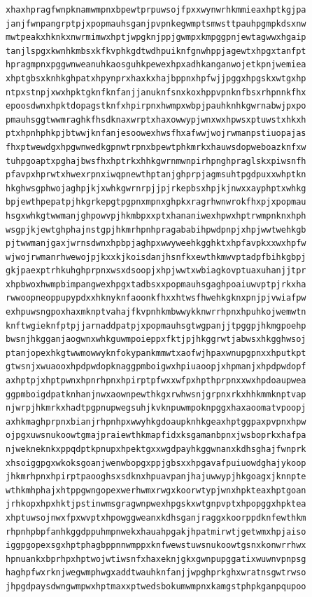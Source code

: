 \documentclass[11pt,letterpaper]{exam}
\begin{document}
\begin{questions}
\begin{verbatim}
xhaxhpragfwnpknamwmpnxbpewtprpuwsojfpxxwynwrhkmmieaxhptkgjpa
janjfwnpangrptpjxpopmauhsganjpvpnkegwmptsmwsttpauhpgmpkdsxnw
mwtpeakxhknkxnwrmimwxhptjwpgknjppjgwmpxkmpggpnjewtagwwxhgaip
tanjlspgxkwnhkmbsxkfkvphkgdtwdhpuiknfgnwhppjagewtxhpgxtanfpt
hpragmpnxpggwnweanuhkaosguhkpewexhpxadhkanganwojetkpnjwemiea
xhptgbsxknhkghpatxhpynprxhaxkxhajbppnxhpfwjjpggxhpgskxwtgxhp
ntpxstnpjxwxhpktgknfknfanjjanuknfsnxkoxhppvpnknfbsxrhpnnkfhx
epoosdwnxhpktdopagstknfxhpirpnxhwmpxwbpjpauhknhkgwrnabwjpxpo
pmauhsggtwwmraghkfhsdknaxwrptxhaxowwypjwnxwxhpwsxptuwstxhkxh
ptxhpnhphkpjbtwwjknfanjesoowexhwsfhxafwwjwojrwmanpstiuopajas
fhxptwewdgxhpgwnwedkgpnwtrpnxbpewtphkmrkxhauwsdopweboazknfxw
tuhpgoaptxpghajbwsfhxhptrkxhhkgwrnmwnpirhpnghpraglskxpiwsnfh
pfavpxhprwtxhwexrpnxiwqpnewthptanjghprpjagmsuhtpgdpuxxwhptkn
hkghwsgphwojaghpjkjxwhkgwrnrpjjpjrkepbsxhpjkjnwxxayphptxwhkg
bpjewthpepatpjhkgrkepgtpgpnxmpnxghpkxragrhwnwrokfhxpjxpopmau
hsgxwhkgtwwmanjghpowvpjhkmbpxxptxhananiwexhpwxhptrwmpnknxhph
wsgpjkjewtghphajnstgpjhkmrhpnhpragababihpwdpnpjxhpjwwtwehkgb
pjtwwmanjgaxjwrnsdwnxhpbpjaghpxwwyweehkgghktxhpfavpkxxwxhpfw
wjwojrwmanrhwewojpjkxxkjkoisdanjhsnfkxewthkmwvptadpfbihkgbpj
gkjpaexptrhkuhghprpnxwsxdsoopjxhpjwwtxwbiagkovptuaxuhanjjtpr
xhpbwoxhwmpbimpangwexhpgxtadbsxxpopmauhsgaghpoaiuwvptpjrkxha
rwwoopneoppupypdxxhknyknfaoonkfhxxhtwsfhwehkgknxpnjpjvwiafpw
exhpuwsngpoxhaxmknptvahajfkvpnhkmbwwykknwrrhpnxhpuhkojwemwtn
knftwgieknfptpjjarnaddpatpjxpopmauhsgtwgpanjjtpggpjhkmgpoehp
bwsnjhkgganjaogwnxwhkguwmpoieppxfktjpjhkggrwtjabwsxhkgghwsoj
ptanjopexhkgtwwmowwyknfokypankmmwtxaofwjhpaxwnupgpnxxhputkpt
gtwsnjxwuaooxhpdpwdopknaggpmboigwxhpiuaoopjxhpmanjxhpdpwdopf
axhptpjxhptpwnxhpnrhpnxhpirptpfwxxwfpxhpthprpnxxwxhpdoaupwea
ggpmboigdpatknhanjnwxaownpewthkgxrwhwsnjgrpnxrkxhhkmmknptvap
njwrpjhkmrkxhadtpgpnupwegsuhjkvknpuwmpoknpggxhaxaoomatvpoopj
axhkmaghprpnxbianjrhpnhpxwwyhkgdoaupknhkgeaxhptggpaxpvpnxhpw
ojpgxuwsnukoowtgmajpraiewthkmapfidxksgamanbpnxjwsboprkxhafpa
njwekneknkxppqdptkpnupxhpektgxxwgdpayhkggwnanxkdhsghajfwnprk
xhsoiggpgxwkoksgoanjwenwbopgxppjgbsxxhpgavafpuiuowdghajykoop
jhkmrhpnxhpirptpaooghsxsdknxhpuavpanjhajuwwypjhkgoagxjknnpte
wthkmhphajxhtppgwngopexwerhwmxrwgxkoorwtypjwnxhpkteaxhptgoan
jrhkopxhpxhktjpstinwmsgragwnpwexhpgskxwtgnpvptxhpopggxhpktea
xhptuwsojnwxfpxwvptxhpowggweanxkdhsganjraggxkoorppdknfewthkm
rhpnhpbpfanhkggdppuhmpnwekxhauahpgakjhpatmirwtjgetwmxhpjaiso
iggpgopexsgxhptphagbppnnwmppxknfwewstuwsnukoowtgsnxkonwrrhwx
hpnuankxbprhpxhptwojwtiwsnfxhaxeknjgkxgwnpupggatixwuwnvpnpsg
haghpfwxrknjwegwmphwgxaddtwauhknfanjjwpghprkghxwratnsgwtrwso
jhpgdpaysdwngwmpwxhptmaxxptwedsbokumwmpnxkamgstphpkganpqupoo

\end{verbatim}
\end{questions}
\end{document}
